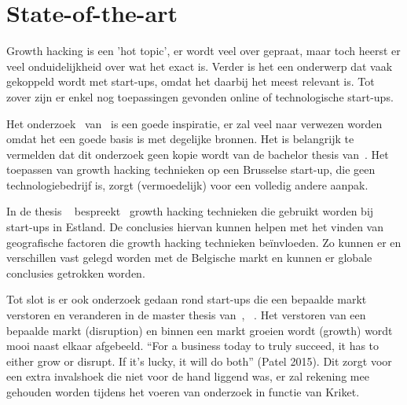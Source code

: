\section{State-of-the-art}
\label{sec:state-of-the-art}

Growth hacking is een 'hot topic', er wordt veel over gepraat, maar toch heerst er veel onduidelijkheid over wat het exact is. Verder is het een onderwerp dat vaak gekoppeld wordt met start-ups, omdat het daarbij het meest relevant is. Tot zover zijn er enkel nog toepassingen gevonden online of technologische start-ups.

Het onderzoek~ van~\textcite{Lee2016} is een goede inspiratie, er zal veel naar verwezen worden omdat het een goede basis is met degelijke bronnen. Het is belangrijk te vermelden dat dit onderzoek geen kopie wordt van de bachelor thesis van~\textcite{Lee2016}. Het toepassen van growth hacking technieken op een Brusselse start-up, die geen technologiebedrijf is, zorgt (vermoedelijk) voor een volledig andere aanpak. 

In de thesis ~ bespreekt~\textcite{Vunk2017} growth hacking technieken die gebruikt worden bij start-ups in Estland. De conclusies hiervan kunnen helpen met het vinden van geografische factoren die growth hacking technieken beïnvloeden. Zo kunnen er en verschillen vast gelegd worden met de Belgische markt en kunnen er globale conclusies getrokken worden.

Tot slot is er ook onderzoek gedaan rond start-ups die een bepaalde markt verstoren en veranderen in de master thesis van~\textcite{Bergendal2017}, ~. Het verstoren van een bepaalde markt (disruption) en binnen een markt groeien wordt (growth) wordt mooi naast elkaar afgebeeld. “For a business today to truly succeed, it has to either grow or disrupt. If it’s lucky, it will do both” (Patel 2015). Dit zorgt voor een extra invalshoek die niet voor de hand liggend was, er zal rekening mee gehouden worden tijdens het voeren van onderzoek in functie van Kriket. 


